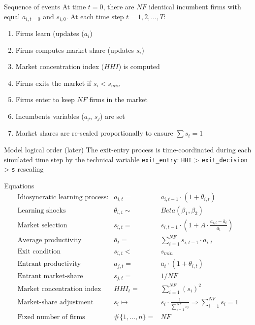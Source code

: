 \documentclass[bigger,aspectratio=169]{beamer}
\begin{document}
\begin{frame}[label={sec:org1ee0c79},fragile]{Sequence of events}
 At time \(t = 0\), there are \(NF\) identical incumbent firms with equal \(a_{i,t=0}\) and \(s_{i,0}\).
At each time step \(t = 1, 2, \ldots, T\):
\begin{enumerate}
\item Firms learn (updates (\(a_{i}\))
\item Firms computes market share (updates \(s_{i}\))
\item Market concentration index (\(HHI\)) is computed
\item Firms exits the market if \(s_{i} < s_{min}\)
\item Firms enter to keep \(NF\) firms in the market
\item Incumbents variables (\(a_{j}\), \(s_{j}\)) are set
\item Market shares are re-scaled proportionally to ensure \(\sum s_{i} = 1\)
\end{enumerate}
\begin{block}{Model logical order (later)}
The exit-entry process is time-coordinated during each simulated time step by the technical variable \texttt{exit\_entry}: \texttt{HHI} > \texttt{exit\_decision} > \texttt{s} rescaling
\end{block}
\end{frame}
\begin{frame}[label={sec:org6b3a18f}]{Equations}
\[ \begin{array}{lrl}
\mbox{Idiosyncratic learning process:} & a_{i,t} = &a_{i,t-1}\cdot (1 + \theta_{i,t})\\
\mbox{Learning shocks} & \theta_{i,t} \sim  & Beta(\beta_1, \beta_2)\\
\mbox{Market selection} & s_{i,t} =  & s_{i,t-1} \cdot \left( 1 + A\cdot\frac{a_{i,t} - \bar{a}_{t}}{\bar{a}_{t}}\right) \\
\mbox{Average productivity} & \bar{a}_{t} =  & \sum_{i=1}^{NF} s_{i, t-1}\cdot a_{i,t} \\
\mbox{Exit condition} & s_{i,t} < & s_{min}\\
\mbox{Entrant productivity} & a_{j,t} =&  \bar{a}_{t}\cdot (1 + \theta_{i,t})\\
\mbox{Entrant market-share} & s_{j,t} =& 1/NF \\
\mbox{Market concentration index} & HHI_{t} =& \sum_{i=1}^{NF} (s_{i})^2 \\
\mbox{Market-share adjustment} &  s_{i} \mapsto & s_{i}\cdot \frac{1}{\sum_{i=1}^{NF} s_{i}} \Rightarrow \sum_{i=1}^{NF} s_{i} = 1 \\
\mbox{Fixed number of firms} & \#\{1, \ldots, n\} =& NF
\end{array}\]
\end{frame}
\end{document}
